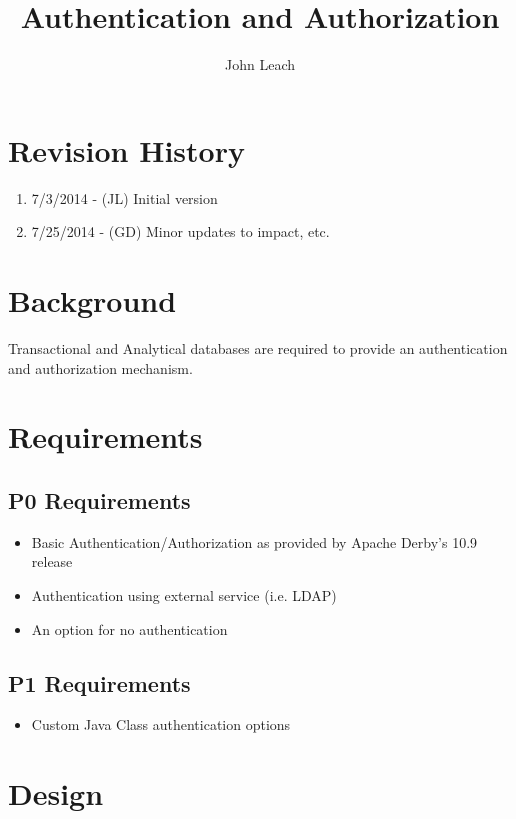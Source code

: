 \documentclass{article}
\begin{document}
\title{Authentication and Authorization}
\author{John Leach}
\maketitle
\makeauthor
\thispagestyle{fancy}

\section{Revision History}
\begin{enumerate}
  \item 7/3/2014 - (JL) Initial version
  \item 7/25/2014 - (GD) Minor updates to impact, etc.
\end{enumerate}

\section{Background}
Transactional and Analytical databases are required to provide an
authentication and authorization mechanism.

\section{Requirements}

\subsection{P0 Requirements}
\begin{itemize}
  \item Basic Authentication/Authorization as provided by Apache Derby's 10.9 release
  \item Authentication using external service (i.e. LDAP)
  \item An option for no authentication
\end{itemize}

\subsection{P1 Requirements}
\begin{itemize}
  \item Custom Java Class authentication options
\end{itemize}


\section{Design}
\end{document}
